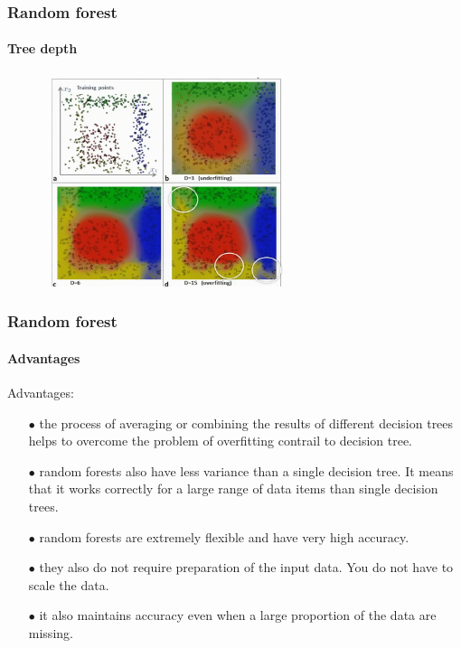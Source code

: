 \begin{frame}
	\frametitle{Random forest}
		\framesubtitle{Tree depth}
	
		\vfill
		
		\begin{figure}
			\includegraphics[width=7cm]{./figures/depth}
		\end{figure}

\end{frame}

\begin{frame}
	\frametitle{Random forest}
		\framesubtitle{Advantages}

		Advantages:
		\begin{itemize}
		  \item[$\bullet$] the process of averaging or combining the results of different decision trees helps to overcome the problem of overfitting contrail to decision tree.
		  \item[$\bullet$] random forests also have less variance than a single decision tree. It means that it works correctly for a large range of data items than single decision trees.
		  \item[$\bullet$] random forests are extremely flexible and have very high accuracy.
		  \item[$\bullet$] they also do not require preparation of the input data. You do not have to scale the data.
		  \item[$\bullet$] it also maintains accuracy even when a large proportion of the data are missing.
		\end{itemize}

\end{frame}

